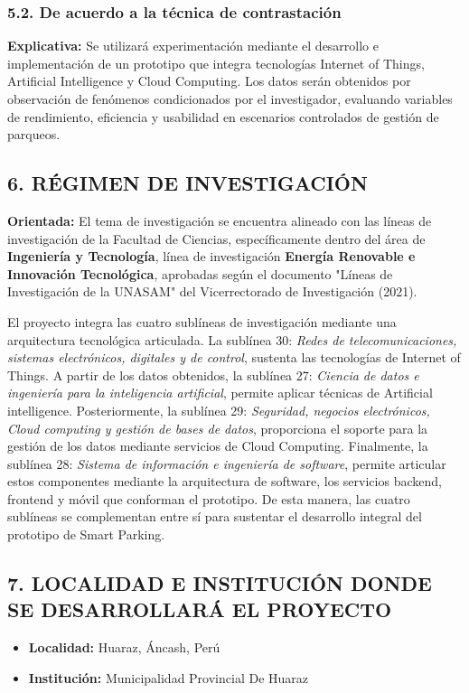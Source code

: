 \documentclass[12pt,a4paper]{article}
\begin{document}
\subsubsection*{5.2. De acuerdo a la técnica de contrastación}
\textbf{Explicativa:} Se utilizará experimentación mediante el desarrollo e implementación de un prototipo que integra tecnologías Internet of Things, Artificial Intelligence y Cloud Computing. Los datos serán obtenidos por observación de fenómenos condicionados por el investigador, evaluando variables de rendimiento, eficiencia y usabilidad en escenarios controlados de gestión de parqueos.

\subsection*{6. RÉGIMEN DE INVESTIGACIÓN}

\textbf{Orientada:} El tema de investigación se encuentra alineado con las líneas de investigación de la Facultad de Ciencias, específicamente dentro del área de \textbf{Ingeniería y Tecnología}, línea de investigación \textbf{Energía Renovable e Innovación Tecnológica}, aprobadas según el documento "Líneas de Investigación de la UNASAM" del Vicerrectorado de Investigación (2021).

El proyecto integra las cuatro sublíneas de investigación mediante una arquitectura tecnológica articulada. La sublínea 30: \textit{Redes de telecomunicaciones, sistemas electrónicos, digitales y de control}, sustenta las tecnologías de Internet of Things. A partir de los datos obtenidos, la sublínea 27: \textit{Ciencia de datos e ingeniería para la inteligencia artificial}, permite aplicar técnicas de Artificial intelligence. Posteriormente, la sublínea 29: \textit{Seguridad, negocios electrónicos, Cloud computing y gestión de bases de datos}, proporciona el soporte para la gestión de los datos mediante servicios de Cloud Computing. Finalmente, la sublínea 28: \textit{Sistema de información e ingeniería de software}, permite articular estos componentes mediante la arquitectura de software, los servicios backend, frontend y móvil que conforman el prototipo. De esta manera, las cuatro sublíneas se complementan entre sí para sustentar el desarrollo integral del prototipo de Smart Parking.

\subsection*{7. LOCALIDAD E INSTITUCIÓN DONDE SE DESARROLLARÁ EL PROYECTO}
\begin{itemize}[leftmargin=*]
    \item \textbf{Localidad:} Huaraz, Áncash, Perú
    \item \textbf{Institución:} Municipalidad Provincial De Huaraz
\end{itemize}
\end{document}
